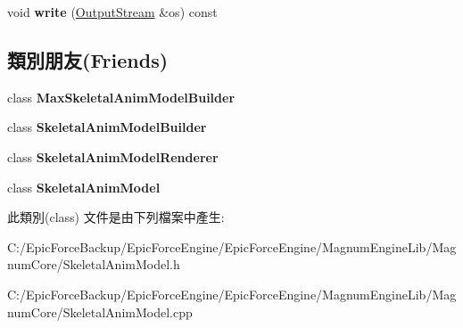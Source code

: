 \begin{DoxyCompactItemize}
\item 
void {\bfseries write} (\hyperlink{class_magnum_1_1_output_stream}{Output\+Stream} \&os) const \hypertarget{class_magnum_1_1_skeletal_anim_model_1_1_mesh_1_1_patch_aa74437643f6b0bf3581d4bbe1216319f}{}\label{class_magnum_1_1_skeletal_anim_model_1_1_mesh_1_1_patch_aa74437643f6b0bf3581d4bbe1216319f}

\end{DoxyCompactItemize}
\subsection*{類別朋友(Friends)}
\begin{DoxyCompactItemize}
\item 
class {\bfseries Max\+Skeletal\+Anim\+Model\+Builder}\hypertarget{class_magnum_1_1_skeletal_anim_model_1_1_mesh_1_1_patch_a68b08defd5651552ef2b6f922eee7ff9}{}\label{class_magnum_1_1_skeletal_anim_model_1_1_mesh_1_1_patch_a68b08defd5651552ef2b6f922eee7ff9}

\item 
class {\bfseries Skeletal\+Anim\+Model\+Builder}\hypertarget{class_magnum_1_1_skeletal_anim_model_1_1_mesh_1_1_patch_a31d58261bc4fbf7a6c1d2d2547437974}{}\label{class_magnum_1_1_skeletal_anim_model_1_1_mesh_1_1_patch_a31d58261bc4fbf7a6c1d2d2547437974}

\item 
class {\bfseries Skeletal\+Anim\+Model\+Renderer}\hypertarget{class_magnum_1_1_skeletal_anim_model_1_1_mesh_1_1_patch_ae50fe2cd824b9de98af4dd4aa51d4935}{}\label{class_magnum_1_1_skeletal_anim_model_1_1_mesh_1_1_patch_ae50fe2cd824b9de98af4dd4aa51d4935}

\item 
class {\bfseries Skeletal\+Anim\+Model}\hypertarget{class_magnum_1_1_skeletal_anim_model_1_1_mesh_1_1_patch_a88c72f2f6b125ba518843b71080035e5}{}\label{class_magnum_1_1_skeletal_anim_model_1_1_mesh_1_1_patch_a88c72f2f6b125ba518843b71080035e5}

\end{DoxyCompactItemize}


此類別(class) 文件是由下列檔案中產生\+:\begin{DoxyCompactItemize}
\item 
C\+:/\+Epic\+Force\+Backup/\+Epic\+Force\+Engine/\+Epic\+Force\+Engine/\+Magnum\+Engine\+Lib/\+Magnum\+Core/Skeletal\+Anim\+Model.\+h\item 
C\+:/\+Epic\+Force\+Backup/\+Epic\+Force\+Engine/\+Epic\+Force\+Engine/\+Magnum\+Engine\+Lib/\+Magnum\+Core/Skeletal\+Anim\+Model.\+cpp\end{DoxyCompactItemize}
